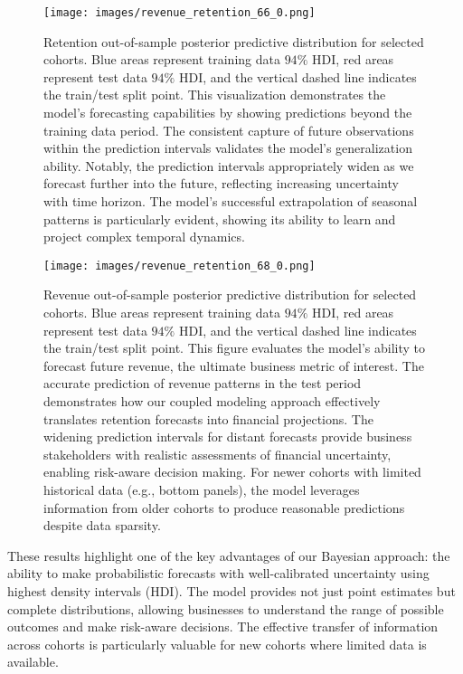 \documentclass[11pt]{amsart}
\theoremstyle{definition}
\begin{document}
\begin{figure}
    \centering
    \texttt{[image: images/revenue\_retention\_66\_0.png]}
    \caption{Retention out-of-sample posterior predictive distribution for selected cohorts. Blue areas represent training
        data $94\%$ HDI, red areas represent test data $94\%$ HDI, and the vertical dashed line indicates the train/test
        split point. This visualization demonstrates the model's forecasting capabilities by showing predictions beyond
        the training data period. The consistent capture of future observations within the prediction intervals validates
        the model's generalization ability. Notably, the prediction intervals appropriately widen as we forecast further
        into the future, reflecting increasing uncertainty with time horizon. The model's successful extrapolation of
        seasonal patterns is particularly evident, showing its ability to learn and project complex temporal dynamics.}
    \label{fig:out_sample_retention}
\end{figure}

\begin{figure}
    \centering
    \texttt{[image: images/revenue\_retention\_68\_0.png]}
    \caption{Revenue out-of-sample posterior predictive distribution for selected cohorts. Blue areas represent training
        data $94\%$ HDI, red areas represent test data $94\%$ HDI, and the vertical dashed line indicates the train/test
        split point. This figure evaluates the model's ability to forecast future revenue, the ultimate business metric
        of interest. The accurate prediction of revenue patterns in the test period demonstrates how our coupled modeling
        approach effectively translates retention forecasts into financial projections. The widening prediction intervals
        for distant forecasts provide business stakeholders with realistic assessments of financial uncertainty, enabling
        risk-aware decision making. For newer cohorts with limited historical data (e.g., bottom panels), the model
        leverages information from older cohorts to produce reasonable predictions despite data sparsity.}
    \label{fig:out_sample_revenue}
\end{figure}

These results highlight one of the key advantages of our Bayesian approach: the ability to make probabilistic forecasts with
well-calibrated uncertainty using highest density intervals (HDI). The model provides not just point estimates but complete
distributions, allowing businesses to understand the range of possible outcomes and make risk-aware decisions. The effective
transfer of information across cohorts is particularly valuable for new cohorts where limited data is available.
\end{document}
